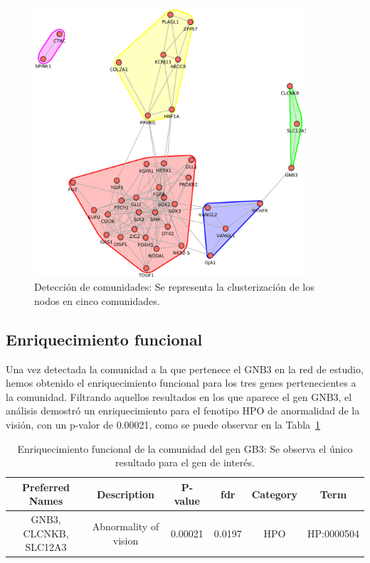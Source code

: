 \begin{figure}[h!]
	\includegraphics[width=0.9\textwidth]{figures/comunidades.pdf}
	\caption{Detección de comunidades: Se representa la clusterización de los nodos en cinco comunidades.}
	\label{fig:comunidad}
\end{figure}

\subsection{Enriquecimiento funcional}

Una vez detectada la comunidad a la que pertenece el GNB3 en la red de estudio, hemos obtenido el enriquecimiento funcional para los tres genes pertenecientes a la comunidad.  Filtrando aquellos resultados en los que aparece el gen GNB3, el análisis demostró un enriquecimiento para el fenotipo HPO de anormalidad de la visión, con un p-valor de 0.00021, como se puede observar en la Tabla~\ref{table:enriquecimiento1}

\begin{table}[h]
	\centering
	\begin{tabular}{|c|c|c|c|c|c|}
		\hline
		Preferred Names & Description & P-value & fdr & Category & Term \\ \hline
		GNB3, CLCNKB, SLC12A3 & Abnormality of vision    & 0.00021 & 0.0197&  HPO & HP:0000504 \\ \hline

	\end{tabular}
	\caption{Enriquecimiento funcional de la comunidad del gen GB3: Se observa el único resultado para el gen de interés.}
	\label{table:enriquecimiento1}
\end{table}

